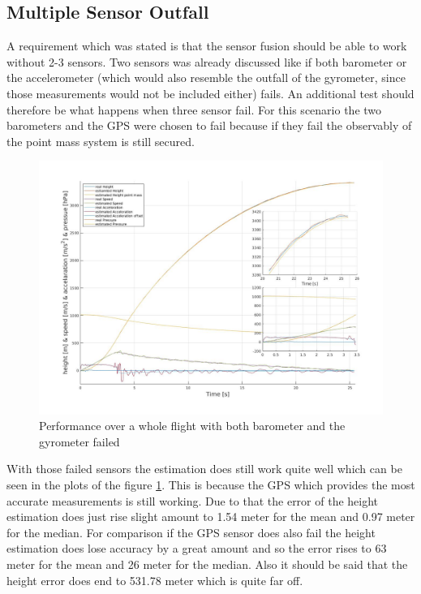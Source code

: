 \newpage
\subsection{Multiple Sensor Outfall}
A requirement which was stated is that the sensor fusion should be able to work without 2-3 sensors.
Two sensors was already discussed like if both barometer or the accelerometer 
(which would also resemble the outfall of the gyrometer, since those measurements would not be included either) fails.
An additional test should therefore be what happens when three sensor fail.
For this scenario the two barometers and the GPS were chosen to fail because if they fail the observably of the point mass system is still secured.

\begin{figure}[h!]
 \centering
 \includegraphics[width=.8\textwidth]{./Pictures/BestSystemPerformanceAccOutfall.jpg}
 \caption{Performance over a whole flight with both barometer and the gyrometer failed}
 \label{fig:PerformanceMOutfall}
\end{figure}

With those failed sensors the estimation does still work quite well which can be seen in the plots of the figure \ref{fig:PerformanceMOutfall}.
This is because the GPS which provides the most accurate measurements is still working.
Due to that the error of the height estimation does just rise slight amount to 1.54 meter for the mean and 0.97 meter for the median.
For comparison if the GPS sensor does also fail the height estimation does lose accuracy by a great amount and so the error rises to 63 meter for the mean and 26 meter for the median.
Also it should be said that the height error does end to 531.78 meter which is quite far off.